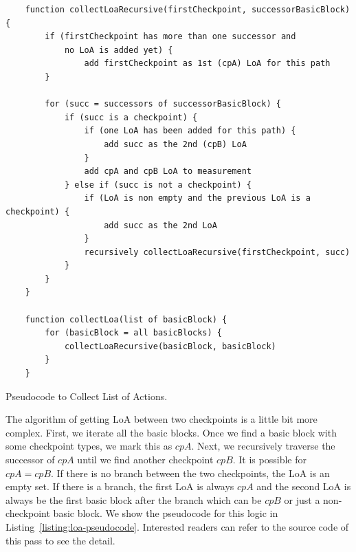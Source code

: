 \begin{listing}[t]
    \begin{verbatim}
    function collectLoaRecursive(firstCheckpoint, successorBasicBlock) {
        if (firstCheckpoint has more than one successor and 
            no LoA is added yet) {
                add firstCheckpoint as 1st (cpA) LoA for this path
        }
        
        for (succ = successors of successorBasicBlock) {
            if (succ is a checkpoint) {
                if (one LoA has been added for this path) {
                    add succ as the 2nd (cpB) LoA
                }
                add cpA and cpB LoA to measurement
            } else if (succ is not a checkpoint) {
                if (LoA is non empty and the previous LoA is a checkpoint) {
                    add succ as the 2nd LoA
                }
                recursively collectLoaRecursive(firstCheckpoint, succ)
            }
        }
    }

    function collectLoa(list of basicBlock) {
        for (basicBlock = all basicBlocks) {
            collectLoaRecursive(basicBlock, basicBlock)
        }
    }
    \end{verbatim}
    \caption{Pseudocode to Collect List of Actions.}
    \label{listing:loa-pseudocode}
\end{listing}
\vspace{20cm}

The algorithm of getting LoA between two checkpoints is a little bit more
complex. First, we iterate all the basic blocks. Once we find a basic block with
some checkpoint types, we mark this as $cpA$. Next, we recursively traverse the
successor of $cpA$ until we find another checkpoint $cpB$. It is possible for
$cpA = cpB$. If there is no branch between the two checkpoints, the LoA is an
empty set. If there is a branch, the first LoA is always $cpA$ and the second
LoA is always be the first basic block after the branch \textemdash{} which can
be $cpB$ or just a non-checkpoint basic block. We show the pseudocode for this
logic in Listing~\ref{listing:loa-pseudocode}.  Interested readers can refer to
the source code of this pass to see the detail.
